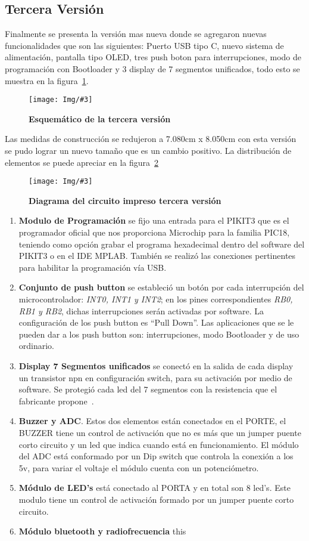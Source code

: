 \documentclass[times, 10pt,twocolumn]{article}
\newcommand{\Img}[5]{
   \begin{figure}[H]
   	   \centering
       \texttt{[image: Img/\#3]}
       \caption{ \centering \textbf{\small #4}}
       \label{#5}
       \end{figure}
   }
\begin{document}
\subsection{Tercera Versión}
Finalmente se presenta la versión mas nueva donde se agregaron nuevas funcionalidades que son las siguientes: Puerto USB tipo C, nuevo sistema de alimentación, pantalla tipo OLED, tres push boton para interrupciones, modo de programación con Bootloader y 3 display de 7 segmentos unificados, todo esto se muestra en la figura~\ref{fig:9}.
\Img{8.5cm}{7.0cm}{Tercera_Version}{Esquemático de la tercera versión}{fig:9}
Las medidas de construcción se redujeron a 7.080cm x 8.050cm con esta versión se pudo lograr un nuevo tamaño que es un cambio positivo. La distribución de elementos se puede apreciar en la figura~\ref{fig:10}
\Img{7.5cm}{7.0cm}{tercera_version_pcb}{Diagrama del circuito impreso tercera versión}{fig:10}
\begin{enumerate}[label=\emph{\Alph*.}] 
  \item \textbf{Modulo de Programación} se fijo una entrada para el PIKIT3 que es el programador oficial que nos proporciona Microchip para la familia PIC18, teniendo como opción grabar el programa hexadecimal dentro del software del PIKIT3 o en el IDE MPLAB. También se realizó las conexiones pertinentes para habilitar la programación vía USB.   
 
  \item \textbf{Conjunto de push button} se estableció un botón por cada interrupción del microcontrolador: \textit{INT0, INT1 y INT2}; en los pines correspondientes \textit{RB0, RB1 y  RB2}, dichas interrupciones serán activadas por software. La configuración de los push button es ``Pull Down''. Las aplicaciones que se le pueden dar a los push button son: interrupciones, modo Bootloader y de uso ordinario.

 
  \item \textbf{Display 7 Segmentos unificados} se conectó en la salida de cada display un transistor npn en configuración switch, para su activación por medio de software. Se protegió cada led del 7 segmentos con la resistencia que el fabricante propone~\cite{ex2}.
  \item \textbf{Buzzer y ADC}. Estos dos elementos están conectados en el PORTE, el BUZZER tiene un control de activación que no es más que un jumper puente corto circuito y un led que indica cuando está en funcionamiento. El módulo del ADC está conformado por un Dip switch que controla la conexión a los 5v, para variar el voltaje el módulo cuenta con un potenciómetro. 
  \item \textbf{Módulo de LED's} está conectado al PORTA y en total son 8 led's. Este modulo tiene un control de activación formado por un jumper puente corto circuito.
  \item \textbf{Módulo bluetooth y radiofrecuencia} this 
\end{enumerate}
\end{document}
